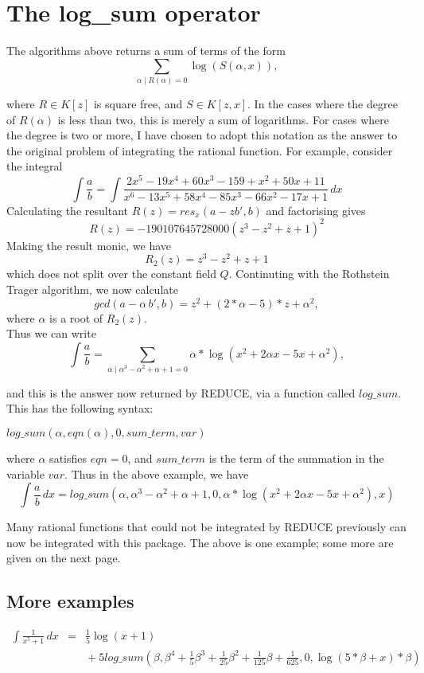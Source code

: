 \section{The log\_sum operator}
The algorithms above returns a sum of terms of the form
\[ \sum_{\alpha \mid R(\alpha)=0} \log(S(\alpha,x)), \]

where $R \in K[z]$ is square free, and $S \in K[z,x]$. In the cases where the degree of $R(\alpha)$ is less than two, this is merely a sum of logarithms. For cases where the degree is two or more, I have chosen to adopt this notation as the answer to the original problem of integrating the rational function. For example,
consider the integral
 \[ \int \frac{a}{b}=\int \frac{2x^5-19x^4+60x^3-159+x^2+50x+11}{x^6-13x^5+58x^4-85x^3-66x^2-17x+1}\, dx \]
Calculating the resultant $R(z)=res_x(a-zb',b)$ and factorising gives
  \[ R(z)=-190107645728000(z^3-z^2+z+1)^{2} \]
Making the result monic, we have
\[ R_2(z)=z^3-z^2+z+1 \]
which does not split over the constant field $Q$.
Continuting with the Rothstein Trager algorithm, we now calculate 
\[ gcd(a-\alpha\,b',b)=z^2+(2*\alpha-5)*z+\alpha^2, \] where $\alpha$ is a root of $R_2(z)$. \\
Thus we can write
\[ \int \frac{a}{b}= \sum_{\alpha \mid \alpha^3-\alpha^2+\alpha+1=0} \alpha*\log(x^2+2\alpha x-5x+\alpha^2), \]

and this is the answer now returned by \small{REDUCE}, via a function called $log\_sum$. This has the following syntax:
\begin{center}$ log\_sum(\alpha,eqn(\alpha),0,sum\_term,var)$ \end{center}
where $\alpha$ satisfies $eqn=0$, and $sum\_term$ is the term of the summation in the variable $var$. Thus in the above example, we have
\[ \int \frac{a}{b}\,dx= log\_sum(\alpha,\alpha^3-\alpha^2+\alpha+1,0,\alpha*\log(x^2+2\alpha x-5x+\alpha^2),x) \]

Many rational functions that could not be integrated by \small{REDUCE} previously can now be integrated with this package. The above is one example; some more are given on the next page.
\pagebreak
\subsection{More examples}
\begin{eqnarray*}
 \int \frac{1}{x^5+1} \, dx & = &\frac{1}{5}\log(x + 1) \\
 &  & \mbox{} + 5log\_sum(\beta,\beta^4+\frac{1}{5}\beta^3+\frac{1}{25}\beta^2+\frac{1}{125}\beta+\frac{1}{625},0,\log(5*\beta+x)*\beta) 
\end{eqnarray*}

